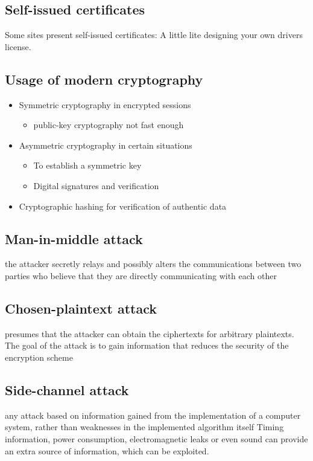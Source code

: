 \begin{multicols}{2}
\subsection{Self-issued certificates}
Some sites present self-issued certificates: A little lite designing your own drivers license.

\subsection{Usage of modern cryptography}
\begin{itemize}
\item Symmetric cryptography in encrypted sessions
  \begin{itemize}
    \item public-key cryptography not fast enough
  \end{itemize}
\item Asymmetric cryptography in certain situations
  \begin{itemize}
  \item To establish a symmetric key
  \item Digital signatures and verification
  \end{itemize}
\item Cryptographic hashing for verification of authentic data
\end{itemize}

\subsection{Man-in-middle attack}
the attacker secretly relays and possibly alters the communications between two parties who believe that they are directly communicating with each other
\subsection{Chosen-plaintext attack}
presumes that the attacker can obtain the ciphertexts for arbitrary plaintexts. The goal of the attack is to gain information that reduces the security of the encryption scheme
\subsection{Side-channel attack}
any attack based on information gained from the implementation of a computer system, rather than weaknesses in the implemented algorithm itself
Timing information, power consumption, electromagnetic leaks or even sound can provide an extra source of information, which can be exploited.

\end{multicols}
